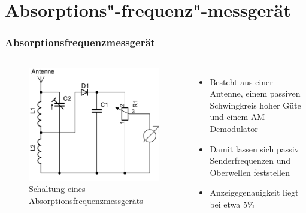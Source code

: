 \section*{Absorptions"-frequenz"-messgerät}
\begin{frame}
  \frametitle{Absorptionsfrequenzmessgerät}
  \begin{columns}
    \begin{center}
      \begin{figure}
        \includegraphics[width=\textwidth,height=.75\textheight,keepaspectratio]{a16/Absorptionsfrequenzmesser.png}
        \caption{Schaltung eines Absorptionsfrequenzmessgeräts}
      \end{figure}
    \end{center}
    \begin{itemize}
      \item Besteht aus einer Antenne, einem passiven Schwingkreis hoher Güte und  einem AM-Demodulator
      \item Damit lassen sich passiv Senderfrequenzen und Oberwellen feststellen
      \item Anzeigegenauigkeit liegt bei etwa 5\%
    \end{itemize}
  \end{columns}
\end{frame}

